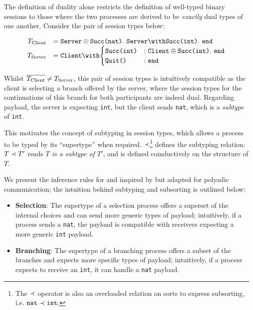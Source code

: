\begin{prooftree}
\end{prooftree}

The definition of duality alone 
restricts the definition of 
well-typed binary sessions to those
where the two processes are derived to be 
\textit{exactly} dual types of one another. 
Consider the pair of session types below:

\[
\begin{array}{rl}
T_{\text{Client}} &= 
	\tselone{Server}{\tmsg{Succ(nat)}}.~
	\tbraone{Server}{\tmsg{Succ(int)}}.~
	\tend \\
T_{\text{Server}} &= \tbraone{Client}{
\begin{cases}
	\tmsg{Succ(int)} &: \tselone{Client}{\tmsg{Succ(int)}}.~\tend \\
	\tmsg{Quit()} &:  \tend \\
\end{cases}
} \\
\end{array}
\]

Whilst $\dual{T_{\text{Client}}} \neq T_{\text{Server}}$, 
this pair of session types is intuitively compatible 
as the client is selecting a branch offered by the server, 
where the session types for the continuations of 
this branch for both participants are indeed dual.
Regarding payload, the server is expecting \texttt{int},
but the client sends \texttt{nat},
which is a \textit{subtype} of \texttt{int}.

This motivates the concept of subtyping in session types,
which allows a process to be typed by its ``supertype'' when required. 
$\subtype$\footnote{
The $\subtype$ operator is also an 
overloaded relation on 
sorts to express subsorting, 
i.e. $\texttt{nat} \subtype \texttt{int}$.
} defines the subtyping relation: 
$T \subtype T'$ reads \textit{$T$ is a subtype of $T'$},
and is defined coinductively on the structure of $T$.

We present the inference rules for 
 and 
inspired by \cite{MPST} but adapted for polyadic communication; 
the intuition behind subtyping and subsorting is outlined below:

\begin{itemize}
\item \textbf{Selection}: 
The supertype of a selection process offers a 
superset of the internal choices and 
can send more generic types of payload; 
intuitively, if a process sends a \texttt{nat}, 
the payload is compatible with receivers expecting 
a more generic \texttt{int} payload.

\item \textbf{Branching}: 
The supertype of a branching process offers 
a subset of the branches and 
expects more specific types of payload; 
intuitively, if a process expects to 
receive an \texttt{int}, 
it can handle a \texttt{nat} payload.
\end{itemize}

